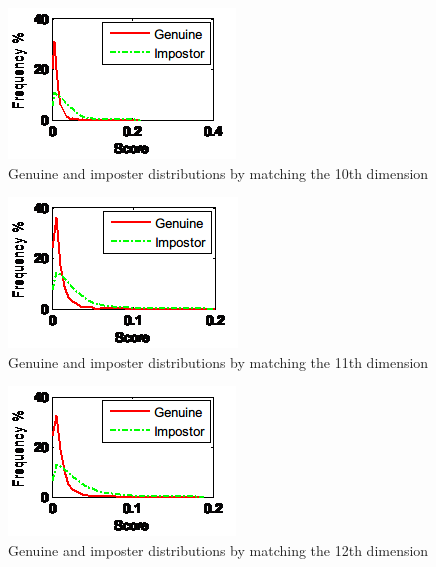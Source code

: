 \begin{figure}[htb]
  \begin{center}
    \includegraphics[scale=1]{ch-experiment/figures/11j}
    \caption{Genuine and imposter distributions by matching the 10th dimension}
    \label{fig:experiment:11j}
  \end{center}
\end{figure}

\begin{figure}[htb]
  \begin{center}
    \includegraphics[scale=1]{ch-experiment/figures/11k}
    \caption{Genuine and imposter distributions by matching the 11th dimension}
    \label{fig:experiment:11k}
  \end{center}
\end{figure}

\begin{figure}[htb]
  \begin{center}
    \includegraphics[scale=1]{ch-experiment/figures/11l}
    \caption{Genuine and imposter distributions by matching the 12th dimension}
    \label{fig:experiment:11l}
  \end{center}
\end{figure}

